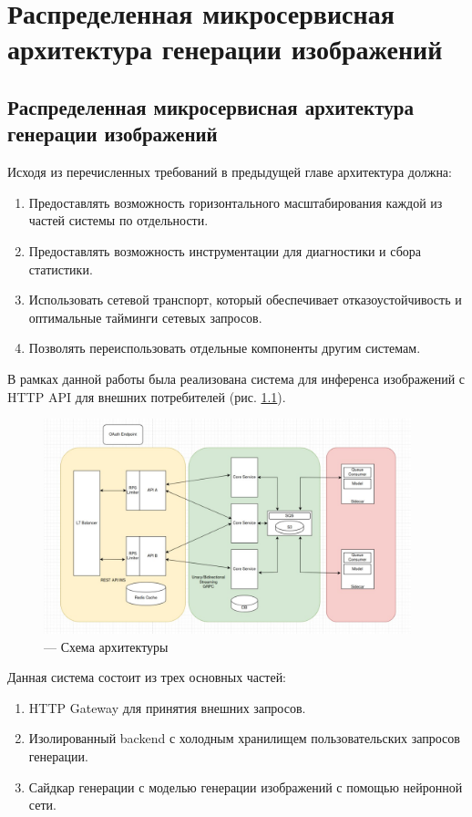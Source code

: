 \chapter{Распределенная микросервисная архитектура генерации изображений}
\section{Распределенная микросервисная архитектура генерации изображений}
Исходя из перечисленных требований в предыдущей главе архитектура должна:
\begin{enumerate}
    \item Предоставлять возможность горизонтального масштабирования каждой из частей системы по отдельности.
    \item Предоставлять возможность инструментации для диагностики и сбора статистики.
    \item Использовать сетевой транспорт, который обеспечивает отказоустойчивость и оптимальные тайминги сетевых запросов.
    \item Позволять переиспользовать отдельные компоненты другим системам.
\end{enumerate}

В рамках данной работы была реализована система для инференса изображений с HTTP API для внешних потребителей (рис. \ref{fig:design}).

\begin{footnotesize}
\begin{figure}[H]
  \centering
  \includegraphics[width=0.95\textwidth]{img/design.png}
  \caption{--- Схема архитектуры}
    \label{fig:design}
\end{figure}
\end{footnotesize}

Данная система состоит из трех основных частей:
\begin{enumerate}
    \item HTTP Gateway для принятия внешних запросов.
    \item Изолированный backend с холодным хранилищем пользовательских запросов генерации.
    \item Сайдкар генерации с моделью генерации изображений с помощью нейронной сети.
\end{enumerate}


